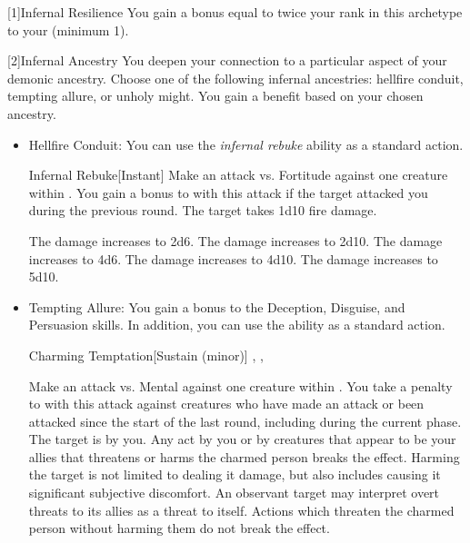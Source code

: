             [1]{Infernal Resilience} You gain a bonus equal to twice your rank in this archetype to your  (minimum 1).

            [2]{Infernal Ancestry} You deepen your connection to a particular aspect of your demonic ancestry.
            Choose one of the following infernal ancestries: hellfire conduit, tempting allure, or unholy might.
            You gain a benefit based on your chosen ancestry.
            \begin{itemize}
                \item Hellfire Conduit: You can use the \textit{infernal rebuke} ability as a standard action.
                    \begin{freeability}{Infernal Rebuke}[Instant]
                        \rankline
                        Make an attack vs. Fortitude against one creature within \shortrange.
                        You gain a  bonus to  with this attack if the target attacked you during the previous round.
                        \hit The target takes 1d10 \add {} fire damage.

                        \rankline
                         The damage increases to 2d6.
                         The damage increases to 2d10.
                         The damage increases to 4d6.
                         The damage increases to 4d10.
                         The damage increases to 5d10.
                    \end{freeability}
                \item Tempting Allure: You gain a  bonus to the Deception, Disguise, and Persuasion skills.
                    In addition, you can use the  ability as a standard action.
                    \begin{durationability}{Charming Temptation}[Sustain (minor)]
                        , , 
                        \rankline
                        \noindent

                        Make an attack vs. Mental against one creature within \medrange.
                        You take a  penalty to  with this attack against creatures who have made an attack or been attacked since the start of the last round, including during the current phase.
                        \vspace{0.25em}
                        \hit The target is \charmed by you.
                        Any act by you or by creatures that appear to be your allies that threatens or harms the charmed person breaks the effect.
                        Harming the target is not limited to dealing it damage, but also includes causing it significant subjective discomfort.
                        An observant target may interpret overt threats to its allies as a threat to itself.
                        \crit Actions which threaten the charmed person without harming them do not break the effect.


\end{durationability}
\end{itemize}
